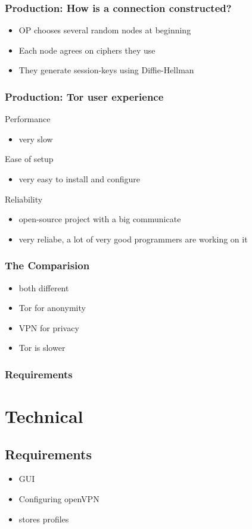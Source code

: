 \documentclass[9pt]{beamer}
\begin{document}
\begin{frame}
\frametitle{Production: How is a connection constructed?}
\begin{itemize}
\item OP chooses several random nodes at beginning
\item Each node agrees on ciphers they use
\item They generate session-keys using Diffie-Hellman
\end{itemize}
\end{frame}

\begin{frame}
\frametitle{Production: Tor user experience}
Performance
\begin{itemize}
\item very slow
\end{itemize}

Ease of setup
\begin{itemize}
 \item very easy to install and configure
\end{itemize}

Reliability
\begin{itemize}
\item open-source project with a big communicate 
\item very reliabe, a lot of
	very good programmers are working on it
\end{itemize}
\end{frame}

\begin{frame}
\frametitle{The Comparision}
	\begin{itemize}
		\item both different
		\item Tor for anonymity
		\item VPN for privacy
		\item Tor is slower
	\end{itemize}
\end{frame}

\begin{frame}
\frametitle{Requirements}
	\section{Technical}
	\subsection{Requirements}
	\begin{itemize}
		\item GUI
		\item Configuring openVPN
		\item stores profiles
	\end{itemize}
\end{frame}
\end{document}
